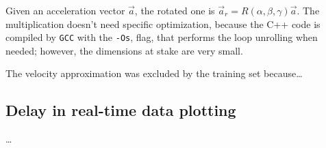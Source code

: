 Given an acceleration vector $\vec a$, the rotated one is $\vec a_r = R(\alpha, \beta, \gamma) \vec a$.
The multiplication doesn't need specific optimization, because the C++ code is compiled by \texttt{GCC} with the \texttt{-Os}, flag, that performs the loop unrolling when needed; however, the dimensions at stake are very small.
\bigbreak

The velocity approximation was excluded by the training set because\dots
\bigbreak

\subsection{Delay in real-time data plotting}
\dots
